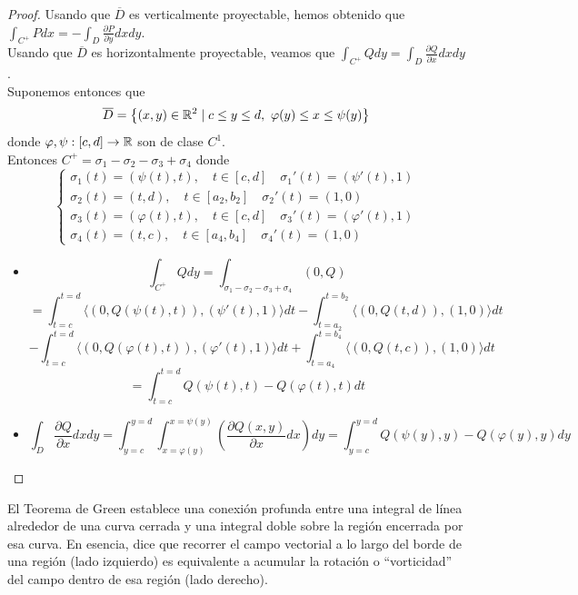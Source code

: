 \begin{proof}
    Usando que $\overline{D}$ es verticalmente proyectable, hemos obtenido que
    $\int_{C^+} Pdx = -\int_{D} \frac{\partial P}{\partial y}dxdy$.\\ Usando que
    $\overline{D}$ es horizontalmente proyectable, veamos que $\int_{C^+} Qdy =
        \int_{D} \frac{\partial Q}{\partial x}dxdy$.\\ Suponemos entonces que
    $$\overline{D} = \left\{ (x,y) \in \mathbb{R}^2 \mid c \leq y \leq d, \ \varphi(y) \leq
        x \leq \psi(y) \right\}$$ donde $\varphi, \psi: [c,d] \to \mathbb{R}$ son de clase
    $C^1$.\\ Entonces $C^+ = \sigma_1 - \sigma_2 - \sigma_3 + \sigma_4$ donde $$
        \begin{cases}
            \sigma_1(t) = (\psi(t), t), \quad t \in [c,d] \quad \sigma_1'(t) = (\psi'(t), 1)       \\
            \sigma_2(t) = (t, d), \quad t \in [a_2, b_2] \quad \sigma_2'(t) = (1, 0)               \\
            \sigma_3(t) = (\varphi(t), t), \quad t \in [c,d] \quad \sigma_3'(t) = (\varphi'(t), 1) \\
            \sigma_4(t) = (t, c), \quad t \in [a_4, b_4] \quad \sigma_4'(t) = (1, 0)
        \end{cases}
    $$

    \begin{itemize}
        \item $$\int_{C^+} Qdy = \int_{\sigma_1 - \sigma_2 - \sigma_3 + \sigma_4} (0,Q) $$
              $$= \int_{t=c}^{t=d} \langle (0,Q(\psi(t),t)), (\psi'(t),1) \rangle dt - \int_{t=a_2}^{t=b_2} \langle (0,Q(t,d)), (1,0) \rangle dt $$
              $$- \int_{t=c}^{t=d} \langle (0,Q(\varphi(t),t)), (\varphi'(t),1) \rangle dt + \int_{t=a_4}^{t=b_4} \langle (0,Q(t,c)), (1,0) \rangle dt $$
              $$= \int_{t=c}^{t=d} Q(\psi(t),t) - Q(\varphi(t),t) dt$$
        \item $$\int_{D} \frac{\partial Q}{\partial x}dxdy = \int_{y=c}^{y=d} \int_{x=\varphi(y)}^{x=\psi(y)} \left( \frac{\partial Q(x,y)}{\partial x} dx \right) dy = \int_{y=c}^{y=d} Q(\psi(y),y) - Q(\varphi(y),y) dy$$
    \end{itemize}

\end{proof}

El Teorema de Green establece una conexión profunda entre una integral de línea
alrededor de una curva cerrada y una integral doble sobre la región encerrada
por esa curva. En esencia, dice que recorrer el campo vectorial a lo largo del
borde de una región (lado izquierdo) es equivalente a acumular la rotación o
“vorticidad” del campo dentro de esa región (lado derecho).

